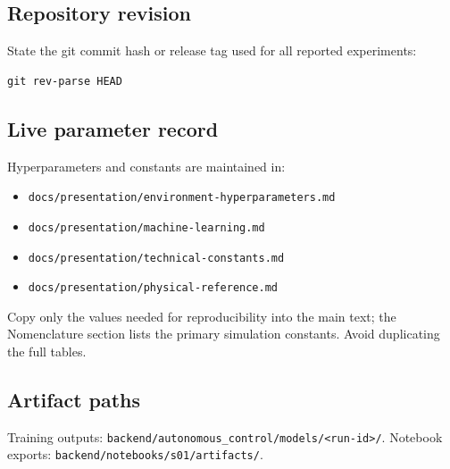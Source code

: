 \label{sec:appendix}

\subsection{Repository revision}
State the git commit hash or release tag used for all reported experiments:
\begin{verbatim}
git rev-parse HEAD
\end{verbatim}

\subsection{Live parameter record}
Hyperparameters and constants are maintained in:
\begin{itemize}
  \item \texttt{docs/presentation/environment-hyperparameters.md}
  \item \texttt{docs/presentation/machine-learning.md}
  \item \texttt{docs/presentation/technical-constants.md}
  \item \texttt{docs/presentation/physical-reference.md}
\end{itemize}
Copy only the values needed for reproducibility into the main text; the Nomenclature section lists the primary simulation constants.
Avoid duplicating the full tables.

\subsection{Artifact paths}
Training outputs: \texttt{backend/autonomous\_control/models/<run-id>/}.
Notebook exports: \texttt{backend/notebooks/s01/artifacts/}.
